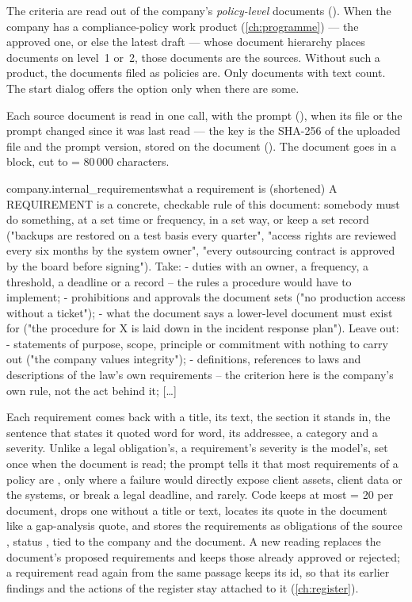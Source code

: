 The criteria are read out of the company's \emph{policy-level} documents
(). When the company has a compliance-policy work product
(\cref{ch:programme}) --- the approved one, or else the latest draft --- whose document
hierarchy places documents on level~1 or~2, those documents are the sources. Without such a
product, the documents filed as policies are. Only documents with text count. The start dialog
offers the option only when there are some.

Each source document is read in one call, with the prompt 
(), when its file or the prompt changed since it was last read --- the
key is the SHA-256 of the uploaded file and the prompt version, stored on the document
(). The document goes in a  block, cut to
 = 80\,000 characters.

\begin{promptexcerpt}{company.internal_requirements}{what a requirement is (shortened)}
  A REQUIREMENT is a concrete, checkable rule of this document: somebody must do something, at a set time or frequency, in a set way, or keep a set record ("backups are restored on a test basis every quarter", "access rights are reviewed every six months by the system owner", "every outsourcing contract is approved by the board before signing"). Take:
  - duties with an owner, a frequency, a threshold, a deadline or a record – the rules a procedure would have to implement;
  - prohibitions and approvals the document sets ("no production access without a ticket");
  - what the document says a lower-level document must exist for ("the procedure for X is laid down in the incident response plan").
  Leave out:
  - statements of purpose, scope, principle or commitment with nothing to carry out ("the company values integrity");
  - definitions, references to laws and descriptions of the law's own requirements – the criterion here is the company's own rule, not the act behind it;
[…]
\end{promptexcerpt}

Each requirement comes back with a title, its text, the section it stands in, the sentence that
states it quoted word for word, its addressee, a category and a severity. Unlike a legal
obligation's, a requirement's severity is the model's, set once when the document is read; the
prompt tells it that most requirements of a policy are ,  only where a
failure would directly expose client assets, client data or the systems, or break a legal
deadline, and  rarely. Code keeps at most  = 20
per document, drops one without a title or text, locates its quote in the document like a
gap-analysis quote, and stores the requirements as obligations of the source ,
status , tied to the company and the document. A new reading replaces the
document's proposed requirements and keeps those already approved or rejected; a requirement
read again from the same passage keeps its id, so that its earlier findings and the actions of
the register stay attached to it (\cref{ch:register}).


